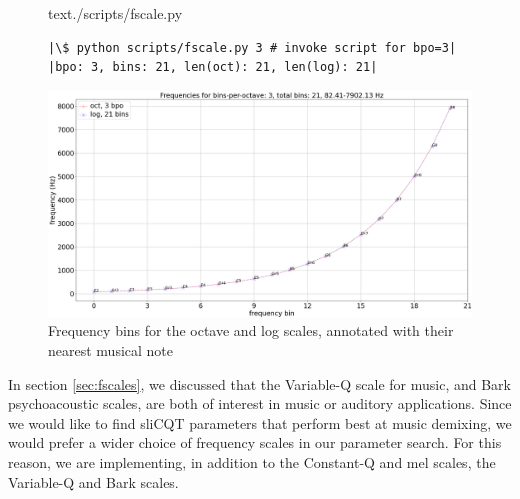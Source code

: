 \documentclass[report.tex]{subfiles}
\begin{document}
\begin{figure}[h]
  \centering
 \begin{minipage}{\textwidth}
  \centering
\setlength\partopsep{-\topsep}
\begin{inputminted}[linenos,breaklines,frame=single,firstline=4,lastline=16,fontsize=\scriptsize]{text}{./scripts/fscale.py}
\end{inputminted}
 \vspace{1em}
 \end{minipage}
 \begin{minipage}{\textwidth}
  \centering
\begin{verbatim}
|\$ python scripts/fscale.py 3 # invoke script for bpo=3|
|bpo: 3, bins: 21, len(oct): 21, len(log): 21|
\end{verbatim}
 \end{minipage}
  \label{code:octvlog}
\end{figure}

\begin{figure}[ht]
	\centering
	\includegraphics[width=\textwidth]{./images-freqscales/log_vs_oct.png}
	\caption{Frequency bins for the octave and log scales, annotated with their nearest musical note}
	\label{fig:octvlog}
\end{figure}

In section \ref{sec:fscales}, we discussed that the Variable-Q scale for music, and Bark psychoacoustic scales, are both of interest in music or auditory applications. Since we would like to find sliCQT parameters that perform best at music demixing, we would prefer a wider choice of frequency scales in our parameter search. For this reason, we are implementing, in addition to the Constant-Q and mel scales, the Variable-Q and Bark scales.
\end{document}

